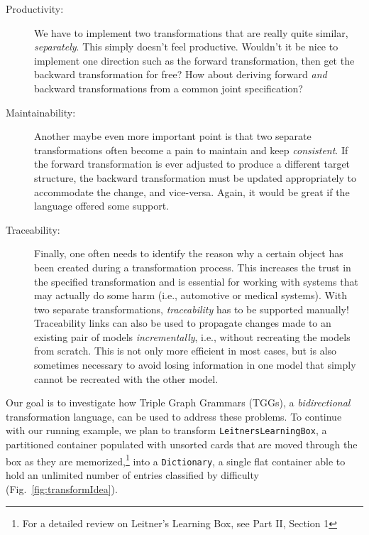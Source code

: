 \begin{description}
\item[Productivity:] We have to implement two transformations that are really quite similar, \emph{separately}. This simply doesn't feel productive.
Wouldn't it be nice to implement one direction such as the forward transformation, then get the backward transformation for free? How about deriving
forward \emph{and} backward transformations from a common joint specification?

\item[Maintainability:] Another maybe even more important point is that two separate transformations often become a pain to maintain and keep
\emph{consistent}. If the forward transformation is ever adjusted to produce a different target structure, the backward transformation must be updated
appropriately to accommodate the change, and vice-versa.  Again, it would be great if the language offered some support.

\item[Traceability:] Finally, one often needs to identify the reason why a certain object has been created during a transformation process. This increases the
trust in the specified transformation and is essential for working with systems that may actually do some harm (i.e., automotive or medical systems). With two
separate transformations, \emph{traceability} has to be supported manually! Traceability links can also be used to propagate changes made to an existing pair of
models \emph{incrementally}, i.e., without recreating the models from scratch. This is not only more efficient in most cases, but is also sometimes necessary to
avoid losing information in one model that simply cannot be recreated with the other model.
\end{description}

Our goal is to investigate how Triple Graph Grammars (TGGs), a \emph{bidirectional} transformation language, can be used to address these problems. To
continue with our running example, we plan to transform \texttt{Leit\-ners\-Learn\-ing\-Box}, a partitioned container populated with unsorted cards that are
moved through the box as they are memorized,\footnote{For a detailed review on Leitner's Learning Box, see Part II, Section 1} into a \texttt{Dictionary}, a
single flat container able to hold an unlimited number of entries classified by difficulty (Fig.~\ref{fig:transformIdea}).

\vspace{0.5cm}


